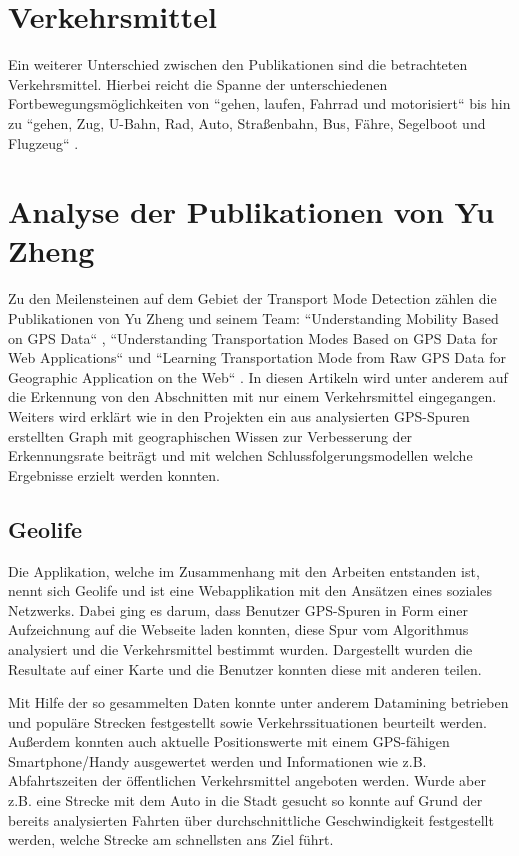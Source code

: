 \section{Verkehrsmittel}
Ein weiterer Unterschied zwischen den Publikationen sind die betrachteten Verkehrsmittel. Hierbei reicht die Spanne der unterschiedenen Fortbewegungsmöglichkeiten von ``gehen, laufen, Fahrrad und motorisiert`` \cite{reddy_using_2010} bis hin zu ``gehen, Zug, U-Bahn, Rad, Auto, Straßenbahn, Bus, Fähre, Segelboot und Flugzeug`` \cite{biljecki_transportation_2013}.

\section{Analyse der Publikationen von Yu Zheng}
Zu den Meilensteinen auf dem Gebiet der Transport Mode Detection zählen die Publikationen von Yu Zheng und seinem Team: ``Understanding Mobility Based on GPS Data`` \cite{zheng_understanding_2008}, ``Understanding Transportation Modes Based on GPS Data for Web Applications`` \cite{zheng_understanding_2010} und ``Learning Transportation Mode from Raw GPS Data for Geographic Application on the Web`` \cite{zheng_learning_2008}. In diesen Artikeln wird unter anderem auf die Erkennung von den Abschnitten mit nur einem Verkehrsmittel eingegangen. Weiters wird erklärt wie in den Projekten ein aus analysierten GPS-Spuren erstellten Graph mit geographischen Wissen zur Verbesserung der Erkennungsrate beiträgt und mit welchen Schlussfolgerungsmodellen welche Ergebnisse erzielt werden konnten. 

\subsection{Geolife}
Die Applikation, welche im Zusammenhang mit den Arbeiten entstanden ist, nennt sich Geolife und ist eine Webapplikation mit den Ansätzen eines soziales Netzwerks. Dabei ging es darum, dass Benutzer GPS-Spuren in Form einer Aufzeichnung auf die Webseite laden konnten, diese Spur vom Algorithmus analysiert und die Verkehrsmittel bestimmt wurden. Dargestellt wurden die Resultate auf einer Karte und die Benutzer konnten diese mit anderen teilen.

Mit Hilfe der so gesammelten Daten konnte unter anderem Datamining betrieben und populäre Strecken festgestellt sowie Verkehrssituationen beurteilt werden. Außerdem konnten auch aktuelle Positionswerte mit einem GPS-fähigen Smartphone/Handy ausgewertet werden und Informationen wie z.B. Abfahrtszeiten der öffentlichen Verkehrsmittel angeboten werden. Wurde aber z.B. eine Strecke mit dem Auto in die Stadt gesucht so konnte auf Grund der bereits analysierten Fahrten über durchschnittliche Geschwindigkeit festgestellt werden, welche Strecke am schnellsten ans Ziel führt.

